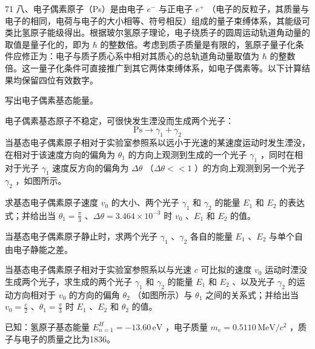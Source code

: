 \begin{problem}[33届物理竞赛决赛]{71}
    八、电子偶素原子（Ps）是由电子 $e^{-}$ 与正电子 $e^{+}$ （电子的反粒子，其质量与电子的相同，电荷与电子的大小相等、符号相反）组成的量子束缚体系，其能级可类比氢原子能级得出。根据玻尔氢原子理论，电子绕质子的圆周运动轨道角动量的取值是量子化的，即为 $\hbar$ 的整数倍。考虑到质子质量是有限的，氢原子量子化条件应修正为：电子与质子质心系中相对其质心的总轨道角动量取值为 $\hbar$ 的整数倍。这一量子化条件可直接推广到其它两体束缚体系，如电子偶素等。以下计算结果均保留四位有效数字。
    \begin{subproblem}
        写出电子偶素基态能量。
    \end{subproblem}
    \begin{subproblem}
        电子偶素基态原子不稳定，可很快发生湮没而生成两个光子：
        \begin{equation*}
            \mathrm{Ps} \to \gamma_{1} + \gamma_{2}
        \end{equation*}
        当基态电子偶素原子相对于实验室参照系以远小于光速的某速度运动时发生湮没，在相对于该速度方向的偏角为 $\theta_{1}$ 的方向上观测到生成的一个光子 $\gamma_{1}$ ，同时在相对于光子 $\gamma_{1}$ 速度反方向的偏角为 $\Delta\theta$ （$\Delta\theta << 1$ ）的方向上观测到另一个光子 $\gamma_{2}$ ，如图所示。
        \begin{subsubproblem}
            求基态电子偶素原子速度 $v_{0}$ 的大小、两个光子 $\gamma_{1}$ 和 $\gamma_{2}$ 的能量 $E_{1}$ 和 $E_{2}$ 的表达式；并给出当 $\theta_{1}=\frac{\pi}{3}$ 、$\Delta\theta=3.464\times10^{-3}$ 时 $v_{0}$ 、$E_{1}$ 和 $E_{2}$ 的值。
        \end{subsubproblem}
        \begin{subsubproblem}
            当基态电子偶素原子静止时，求两个光子 $\gamma_{1}$ 、$\gamma_{2}$ 各自的能量 $E_{1}$ 、$E_{2}$ 与单个自由电子静能之差。
        \end{subsubproblem}
    \end{subproblem}
    \begin{subproblem}
        当基态电子偶素原子相对于实验室参照系以与光速 $c$ 可比拟的速度 $v_{0}$ 运动时湮没生成两个光子，求生成的两个光子 $\gamma_{1}$ 和 $\gamma_{2}$ 的能量 $E_{1}$ 和 $E_{2}$ 、以及光子 $\gamma_{2}$ 的运动方向相对于 $v_{0}$ 的方向的偏角 $\theta_{2}$ （如图所示）与 $\theta_{1}$ 之间的关系式；并给出当 $v_{0} = \frac{c}{2}$ 、$\theta_{1} = \frac{\pi}{3}$ 时 $E_{1}$ 、$E_{2}$ 和 $\theta_{2}$ 的值。

        已知：氢原子基态能量 $E_{n=1}^{H} = -13.60\,\mathrm{eV}$ ，电子质量 $m_{e} = 0.5110\,\mathrm{MeV}/c^{2}$ ，质子与电子的质量之比为1836。
    \end{subproblem}
\end{problem}